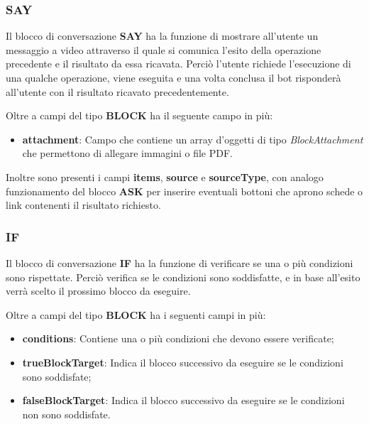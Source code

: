 \subsubsection{SAY}

Il blocco di conversazione \textbf{SAY} ha la funzione di mostrare all'utente un messaggio a video attraverso il quale si comunica l'esito della operazione precedente e il risultato da essa ricavata. Perciò l'utente richiede l'esecuzione di una qualche operazione, viene eseguita e una volta conclusa il bot risponderà all'utente con il risultato ricavato precedentemente.

Oltre a campi del tipo \textbf{BLOCK} ha il seguente campo in più:

\begin{itemize}
	\item \textbf{attachment}: Campo che contiene un array d'oggetti di tipo \textsl{BlockAttachment} che permettono di allegare immagini o file PDF.
\end{itemize}

Inoltre sono presenti i campi \textbf{items}, \textbf{source} e \textbf{sourceType}, con analogo funzionamento del blocco \textbf{ASK} per inserire eventuali bottoni che aprono schede o link contenenti il risultato richiesto.

\subsubsection{IF}

Il blocco di conversazione \textbf{IF} ha la funzione di verificare se una o più condizioni sono rispettate. Perciò verifica se le condizioni sono soddisfatte, e in base all'esito verrà scelto il prossimo blocco da eseguire.

Oltre a campi del tipo \textbf{BLOCK} ha i seguenti campi in più:

\begin{itemize}
	\item \textbf{conditions}: Contiene una o più condizioni che devono essere verificate;
	\item \textbf{trueBlockTarget}: Indica il blocco successivo da eseguire se le condizioni sono soddisfate;
	\item \textbf{falseBlockTarget}: Indica il blocco successivo da eseguire se le condizioni non sono soddisfate.
\end{itemize}


